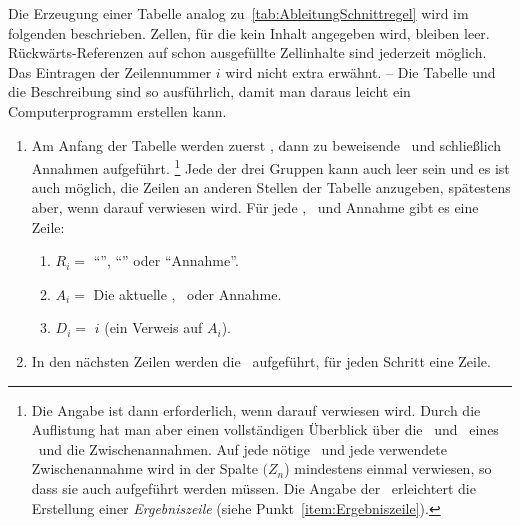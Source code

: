 {Die Erzeugung einer Tabelle analog zu~\vref{tab:AbleitungSchnittregel} wird im folgenden beschrieben.
Zellen, für die kein Inhalt angegeben wird, bleiben leer.
Rückwärts-Referenzen auf schon ausgefüllte Zellinhalte sind jederzeit möglich.
Das Eintragen der Zeilennummer $i$ wird nicht extra erwähnt.
-- Die Tabelle und die Beschreibung sind so ausführlich, damit man daraus leicht ein Computerprogramm erstellen kann.
%
\begin{enumerate}
	\item Am Anfang der Tabelle werden zuerst \Voraussetzungen, dann zu beweisende \Folgerungen\ und schließlich Annahmen aufgeführt.%
	\footnote{%
		Die Angabe ist dann erforderlich, wenn darauf verwiesen wird.
		Durch die Auflistung hat man aber einen vollständigen Überblick über die \Voraussetzungen\ und \Folgerungen\ eines \Beweises\ und die Zwischenannahmen.
		Auf jede nötige \Voraussetzung\ und jede verwendete Zwischenannahme wird in der Spalte $(Z_n$) mindestens einmal verwiesen, so dass sie auch aufgeführt werden müssen.
		Die Angabe der \Folgerungen\ erleichtert die Erstellung einer \emph{Ergebniszeile} (siehe Punkt~\ref{item:Ergebniszeile}).
	}
	Jede der drei Gruppen kann auch leer sein und es ist auch möglich, die Zeilen an anderen Stellen der Tabelle anzugeben, spätestens aber, wenn darauf verwiesen wird.
	Für jede \Voraussetzung, \Folgerung\ und Annahme gibt es eine Zeile:
	\begin{enumerate}
		\item $R_i =$ \enquote{\Voraussetzung}, \enquote{\Folgerung} oder \enquote{Annahme}.
		\item $A_i =$ Die aktuelle \Voraussetzung, \Folgerung\ oder Annahme.
		\item $D_i =$ $i$ \quad (ein Verweis auf $A_i$).
	\end{enumerate}
	\item In den nächsten Zeilen werden die \Beweisschritte\ aufgeführt, für jeden Schritt eine Zeile.


\end{enumerate}}
